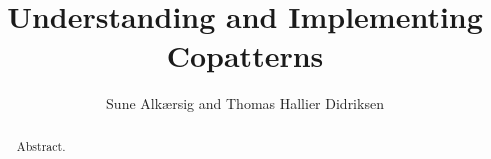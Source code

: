 \documentclass[oribibl]{llncs}
\begin{document}
\mainmatter
\title{Understanding and Implementing Copatterns}
\author{Sune Alk\ae{}rsig and Thomas Hallier Didriksen \\
}

\maketitle

\begin{abstract}
Abstract.
\end{abstract}












\end{document}
